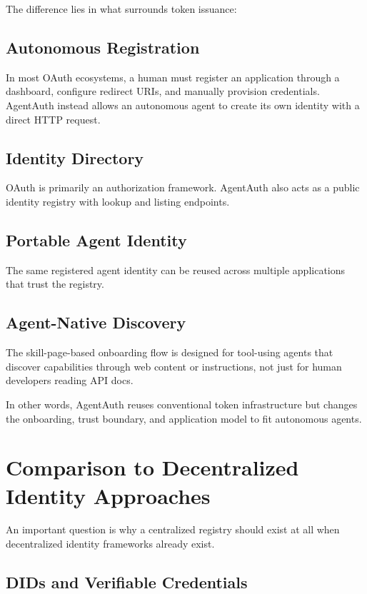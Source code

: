 \documentclass[11pt]{article}
\begin{document}
The difference lies in what surrounds token issuance:

\subsection{Autonomous Registration}

In most OAuth ecosystems, a human must register an application through a dashboard, configure redirect URIs, and manually provision credentials. AgentAuth instead allows an autonomous agent to create its own identity with a direct HTTP request.

\subsection{Identity Directory}

OAuth is primarily an authorization framework. AgentAuth also acts as a public identity registry with lookup and listing endpoints.

\subsection{Portable Agent Identity}

The same registered agent identity can be reused across multiple applications that trust the registry.

\subsection{Agent-Native Discovery}

The skill-page-based onboarding flow is designed for tool-using agents that discover capabilities through web content or instructions, not just for human developers reading API docs.

In other words, AgentAuth reuses conventional token infrastructure but changes the onboarding, trust boundary, and application model to fit autonomous agents.

\section{Comparison to Decentralized Identity Approaches}

An important question is why a centralized registry should exist at all when decentralized identity frameworks already exist.

\subsection{DIDs and Verifiable Credentials}
\end{document}
